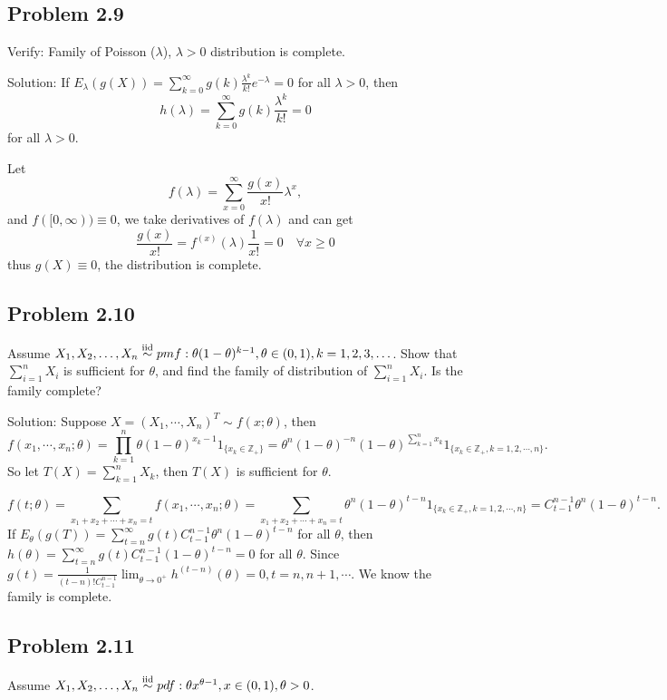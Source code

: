 \subsection*{Problem 2.9}
Verify: Family of Poisson ($\lambda$), $\lambda>0$ distribution is complete.

{Solution:}
If $E_{\lambda}(g(X))=\sum_{k=0}^{\infty}g(k)\frac{\lambda^{k}}{k!}e^{-\lambda}=0$ for all $\lambda>0$, then
\[
h(\lambda)=\sum_{k=0}^{\infty}g(k)\frac{\lambda^{k}}{k!}=0
\]
for all $\lambda>0$.

Let
\[
f(\lambda)=\sum_{x=0}^{\infty}\frac{g(x)}{x!}\lambda^{x},
\]
and $f([0,\infty))\equiv 0$, we take derivatives of $f(\lambda)$ and can get
\[
\frac{g(x)}{x!}=f^{(x)}(\lambda)\frac{1}{x!}=0\quad\forall x\geq 0
\]
thus $g(X)\equiv 0$, the distribution is complete.

\subsection*{Problem 2.10}
Assume $X_{1},X_{2},\ldots,X_{n}\stackrel{\rm iid}{\sim}pmf:\theta(1-\theta)^{k-1},\theta\in(0,1),k=1,2,3,\ldots$. Show that $\sum_{i=1}^{n}X_{i}$ is sufficient for $\theta$, and find the family of distribution of $\sum_{i=1}^{n}X_{i}$. Is the family complete?

{Solution:}
Suppose $X=(X_{1},\cdots,X_{n})^{T}\sim f(x;\theta)$, then
\[
f\left(x_{1},\cdots,x_{n};\theta\right)=\prod_{k=1}^{n}\theta(1-\theta)^{x_{k}-1}1_{\{x_{k}\in\mathbb{Z}_{+}\}}=\theta^{n}(1-\theta)^{-n}(1-\theta)^{\sum_{k=1}^{n}x_{k}}1_{\{x_{k}\in\mathbb{Z}_{+},k=1,2,\cdots,n\}}.
\]
So let $T(X)=\sum_{k=1}^{n}X_{k}$, then $T(X)$ is sufficient for $\theta$.

\[
f(t;\theta)=\sum_{x_{1}+x_{2}+\cdots+x_{n}=t}f\left(x_{1},\cdots,x_{n};\theta\right)=\sum_{x_{1}+x_{2}+\cdots+x_{n}=t}\theta^{n}(1-\theta)^{t-n}1_{\{x_{k}\in\mathbb{Z}_{+},k=1,2,\cdots,n\}}=C_{t-1}^{n-1}\theta^{n}(1-\theta)^{t-n}.
\]
If $E_{\theta}(g(T))=\sum_{t=n}^{\infty}g(t)C_{t-1}^{n-1}\theta^{n}(1-\theta)^{t-n}$ for all $\theta$, then $h(\theta)=\sum_{t=n}^{\infty}g(t)C_{t-1}^{n-1}(1-\theta)^{t-n}=0$ for all $\theta$. Since $g(t)=\frac{1}{(t-n)!C_{t-1}^{n-1}}\lim_{\theta\to 0^{+}}h^{(t-n)}(\theta)=0,t=n,n+1,\cdots$. We know the family is complete.

\subsection*{Problem 2.11}
Assume $X_{1},X_{2},\ldots,X_{n}\stackrel{\rm iid}{\sim}pdf:\theta x^{\theta-1},x\in(0,1),\theta>0$.

